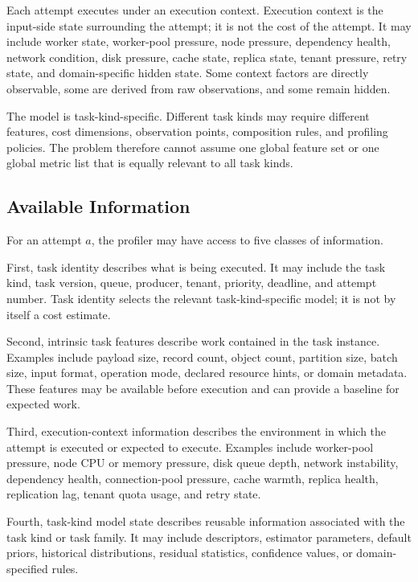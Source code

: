 Each attempt executes under an execution context. Execution context is the
input-side state surrounding the attempt; it is not the cost of the attempt. It
may include worker state, worker-pool pressure, node pressure, dependency
health, network condition, disk pressure, cache state, replica state, tenant
pressure, retry state, and domain-specific hidden state. Some context factors
are directly observable, some are derived from raw observations, and some remain
hidden.

The model is task-kind-specific. Different task kinds may require different
features, cost dimensions, observation points, composition rules, and profiling
policies. The problem therefore cannot assume one global feature set or one
global metric list that is equally relevant to all task kinds.

\subsection{Available Information}
\label{sec:problem-available-information}

For an attempt $a$, the profiler may have access to five classes of information.

First, task identity describes what is being executed. It may include the task
kind, task version, queue, producer, tenant, priority, deadline, and attempt
number. Task identity selects the relevant task-kind-specific model; it is not
by itself a cost estimate.

Second, intrinsic task features describe work contained in the task instance.
Examples include payload size, record count, object count, partition size, batch
size, input format, operation mode, declared resource hints, or domain metadata.
These features may be available before execution and can provide a baseline for
expected work.

Third, execution-context information describes the environment in which the
attempt is executed or expected to execute. Examples include worker-pool
pressure, node CPU or memory pressure, disk queue depth, network instability,
dependency health, connection-pool pressure, cache warmth, replica health,
replication lag, tenant quota usage, and retry state.

Fourth, task-kind model state describes reusable information associated with the
task kind or task family. It may include descriptors, estimator parameters,
default priors, historical distributions, residual statistics, confidence
values, or domain-specified rules.

